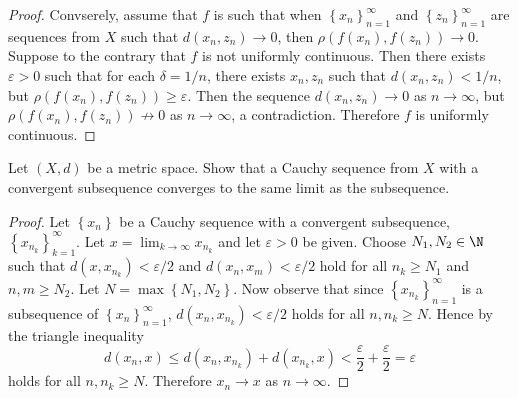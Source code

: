\documentclass[12pt]{amsart}
\begin{document}
\begin{setup}
\begin{ex}
\begin{proof}
      Convserely, assume that $f$ is such that when $\left\{x_n\right\}_{n=1}^\infty$ and $\left\{z_n\right\}_{n=1}^\infty$ are sequences from $X$ such that $d(x_n, z_n) \rightarrow 0$, then $\rho(f(x_n), f(z_n)) \rightarrow 0$.
      Suppose to the contrary that $f$ is not uniformly continuous.
      Then there exists $\varepsilon > 0$ such that for each $\delta = 1/n$, there exists $x_n, z_n$ such that $d(x_n, z_n) < 1/n$, but $\rho(f(x_n), f(z_n)) \geq \varepsilon.$
      Then the sequence $d(x_n, z_n) \rightarrow 0$ as $n \rightarrow \infty$, but $\rho(f(x_n), f(z_n)) \not \rightarrow 0$ as $n \rightarrow \infty$, a contradiction.
      Therefore $f$ is uniformly continuous.
    \end{proof}
  \end{ex}

\end{setup}

\begin{setup}
  Let $(X,d)$ be a metric space.
  Show that a Cauchy sequence from $X$ with a convergent subsequence converges to the same limit as the subsequence.
  \begin{proof}
    Let $\left\{x_n\right\}$ be a Cauchy sequence with a convergent subsequence, $\left\{x_{n_k}\right\}_{k=1}^\infty$.
    Let $x = \lim_{k \rightarrow \infty} x_{n_k}$ and let $\varepsilon > 0$ be given.
    Choose $N_1, N_2 \in \N$ such that $d(x,x_{n_k}) < \varepsilon/2$ and $d(x_n, x_m) < \varepsilon/2$ hold for all $n_k \geq N_1$ and $n,m \geq N_2$.
    Let $N = \max\left\{N_1, N_2\right\}$.
    Now observe that since $\left\{x_{n_k}\right\}_{n=1}^\infty$ is a subsequence of $\left\{x_n\right\}_{n=1}^\infty$, $d(x_n, x_{n_k}) < \varepsilon/2$ holds for all $n, n_k \geq N$.
    Hence by the triangle inequality $$d(x_n, x) \leq d(x_n, x_{n_k}) + d(x_{n_k}, x) < \frac{\varepsilon}{2} + \frac{\varepsilon}{2} = \varepsilon$$
    holds for all $n, n_k \geq N$.
    Therefore $x_n \rightarrow x$ as $n \rightarrow \infty$.
  \end{proof}
\end{setup}
\end{document}
